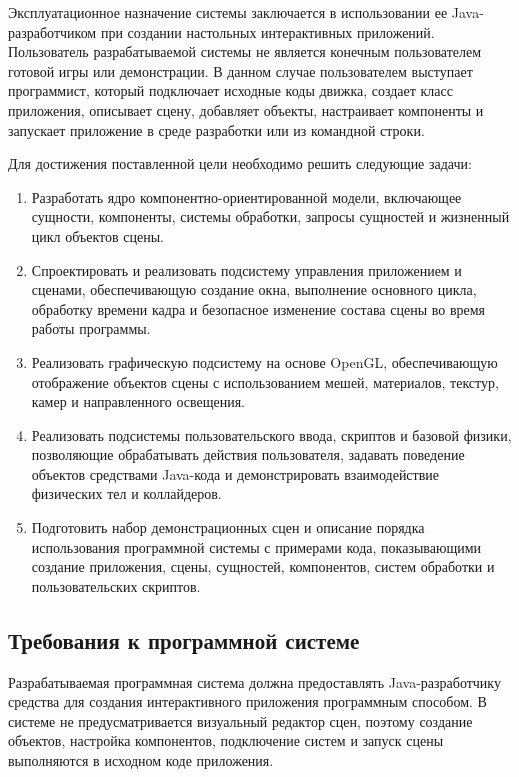 Эксплуатационное назначение системы заключается в использовании ее Java-разработчиком при создании настольных интерактивных приложений. Пользователь разрабатываемой системы не является конечным пользователем готовой игры или демонстрации. В данном случае пользователем выступает программист, который подключает исходные коды движка, создает класс приложения, описывает сцену, добавляет объекты, настраивает компоненты и запускает приложение в среде разработки или из командной строки.

Для достижения поставленной цели необходимо решить следующие задачи:
{
\renewcommand{\labelenumi}{\arabic{enumi}.}
\begin{enumerate}
\item Разработать ядро компонентно-ориентированной модели, включающее сущности, компоненты, системы обработки, запросы сущностей и жизненный цикл объектов сцены.

\item Спроектировать и реализовать подсистему управления приложением и сценами, обеспечивающую создание окна, выполнение основного цикла, обработку времени кадра и безопасное изменение состава сцены во время работы программы.

\item Реализовать графическую подсистему на основе OpenGL, обеспечивающую отображение объектов сцены с использованием мешей, материалов, текстур, камер и направленного освещения.

\item Реализовать подсистемы пользовательского ввода, скриптов и базовой физики, позволяющие обрабатывать действия пользователя, задавать поведение объектов средствами Java-кода и демонстрировать взаимодействие физических тел и коллайдеров.

\item Подготовить набор демонстрационных сцен и описание порядка использования программной системы с примерами кода, показывающими создание приложения, сцены, сущностей, компонентов, систем обработки и пользовательских скриптов.
\end{enumerate}
}

\subsection{Требования к программной системе}

Разрабатываемая программная система должна предоставлять Java-разработчику средства для создания интерактивного приложения программным способом. В системе не предусматривается визуальный редактор сцен, поэтому создание объектов, настройка компонентов, подключение систем и запуск сцены выполняются в исходном коде приложения.


